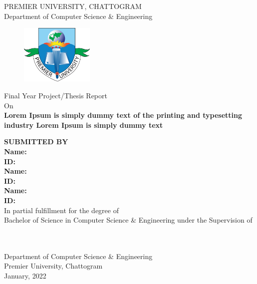 \begin{titlepage}
    \vspace*{-30mm}
    \begin{center}
    \Large{PREMIER UNIVERSITY, CHATTOGRAM}\\
    \large{Department of Computer Science \& Engineering}
    \end{center}
    \vspace*{-5mm}
    \begin{figure}[H]
    \centering
    \includegraphics[width=3.5cm]{puc_logo.png}
    \end{figure} 
    \vspace*{-15mm}
    \begin{center}
        Final Year Project/Thesis Report \\ On \\
        \Large{\textbf{Lorem Ipsum is simply dummy text of the printing and typesetting industry Lorem Ipsum is simply dummy text}}\\
        \vspace{15px}
        
        \uppercase{\textbf{SUBMITTED BY}} \\
        \vspace{5px}
        \textbf{Name:} \firstAuthorName\\
        \textbf{ID:} \firstAuthorId \\
        \vspace{5px}
        \textbf{Name:} \secondAuthorName\\
        \textbf{ID:} \secondAuthorId \\
        \vspace{5px}
        \textbf{Name:} \thirdAuthorName\\
        \textbf{ID:} \thirdAuthorId \\
        \vspace{5px}
        In partial fulfillment for the degree of \\
        Bachelor of Science in Computer Science \& Engineering under the Supervision of
        
        \vspace{10px}
        \supervisorName \\
        \supervisorDesignation \\
        Department of Computer Science \& Engineering \\
        Premier University, Chattogram \\
        \vspace{5mm}
        January, 2022
        
        \vspace{20px}
        
        
        
    \end{center}
    
    
\end{titlepage}